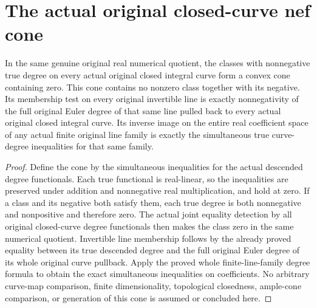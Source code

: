 \section{The actual original closed-curve nef cone}
\label{sec:native-numerical-nef-cone}

\begin{theorem}
\label{thm:native-numerical-nef-cone}
\leanok
{}
In the same genuine original real numerical quotient, the classes
with nonnegative true degree on every actual original closed
integral curve form a convex cone containing zero. This cone
contains no nonzero class together with its negative. Its
membership test on every original invertible line is exactly
nonnegativity of the full original Euler degree of that same line
pulled back to every actual original closed integral curve. Its
inverse image on the entire real coefficient space of any actual
finite original line family is exactly the simultaneous true
curve-degree inequalities for that same family.
\end{theorem}

\begin{proof}
Define the cone by the simultaneous inequalities for the actual
descended degree functionals. Each true functional is real-linear,
so the inequalities are preserved under addition and nonnegative
real multiplication, and hold at zero. If a class and its negative
both satisfy them, each true degree is both nonnegative and
nonpositive and therefore zero. The actual joint equality
detection by all original closed-curve degree functionals then
makes the class zero in the same numerical quotient. Invertible
line membership follows by the already proved equality between
its true descended degree and the full original Euler degree of
its whole original curve pullback. Apply the proved whole
finite-line-family degree formula to obtain the exact simultaneous
inequalities on coefficients. No arbitrary curve-map comparison,
finite dimensionality, topological closedness, ample-cone
comparison, or generation of this cone is assumed or concluded
here.
\end{proof}
